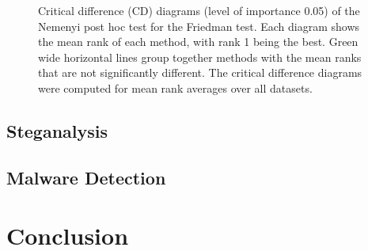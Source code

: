 \begin{figure}[!p]
  \centering
  
  \caption{Critical difference (CD) diagrams (level of importance 0.05) of the Nemenyi post hoc test for the Friedman test. Each diagram shows the mean rank of each method, with rank 1 being the best. Green wide horizontal lines group together methods with the mean ranks that are not significantly different. The critical difference diagrams were computed for mean rank averages over all datasets.}
  \label{fig: critical diagrams primal NN}
\end{figure}

\subsection{Steganalysis}

\subsection{Malware Detection}

\newpage

\section{Conclusion}




